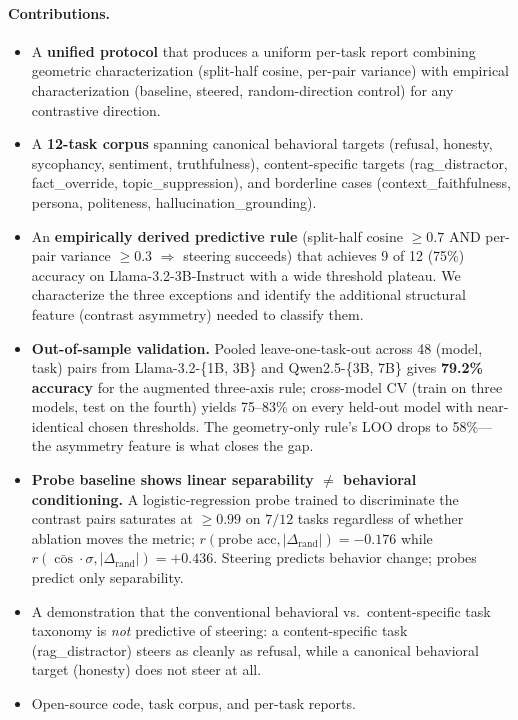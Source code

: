 \documentclass[11pt]{article}
\begin{document}
\paragraph{Contributions.}
\begin{itemize}
\item A \textbf{unified protocol} that produces a uniform per-task
report combining geometric characterization (split-half cosine,
per-pair variance) with empirical characterization (baseline,
steered, random-direction control) for any contrastive
direction.
\item A \textbf{12-task corpus} spanning canonical behavioral targets
(refusal, honesty, sycophancy, sentiment, truthfulness),
content-specific targets (rag\_distractor, fact\_override,
topic\_suppression), and borderline cases (context\_faithfulness,
persona, politeness, hallucination\_grounding).
\item An \textbf{empirically derived predictive rule} (split-half
cosine $\geq 0.7$ AND per-pair variance $\geq 0.3$ $\Rightarrow$
steering succeeds) that achieves 9 of 12 (75\%) accuracy on
Llama-3.2-3B-Instruct with a wide threshold plateau. We characterize
the three exceptions and identify the additional structural feature
(contrast asymmetry) needed to classify them.
\item \textbf{Out-of-sample validation.} Pooled leave-one-task-out
across 48 (model, task) pairs from Llama-3.2-\{1B, 3B\} and
Qwen2.5-\{3B, 7B\} gives \textbf{79.2\% accuracy} for the augmented
three-axis rule; cross-model CV (train on three models, test on the
fourth) yields 75--83\% on every held-out model with near-identical
chosen thresholds. The geometry-only rule's LOO drops to 58\%---
the asymmetry feature is what closes the gap.
\item \textbf{Probe baseline shows linear separability $\neq$
behavioral conditioning.} A logistic-regression probe trained to
discriminate the contrast pairs saturates at $\geq 0.99$ on $7/12$
tasks regardless of whether ablation moves the metric;
$r(\text{probe acc}, |\Delta_{\text{rand}}|) = -0.176$ while
$r(\bar{\cos}\cdot\sigma, |\Delta_{\text{rand}}|) = +0.436$.
Steering predicts behavior change; probes predict only
separability.
\item A demonstration that the conventional behavioral
vs.~content-specific task taxonomy is \emph{not} predictive of
steering: a content-specific task (rag\_distractor) steers as
cleanly as refusal, while a canonical behavioral target (honesty)
does not steer at all.
\item Open-source code, task corpus, and per-task reports.
\end{itemize}
\end{document}
